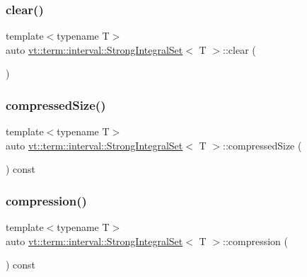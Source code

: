 \subsubsection{\texorpdfstring{clear()}{clear()}}
{\footnotesize\ttfamily template$<$typename T$>$ \\
auto \hyperlink{structvt_1_1term_1_1interval_1_1_strong_integral_set}{vt\+::term\+::interval\+::\+Strong\+Integral\+Set}$<$ T $>$\+::clear (\begin{DoxyParamCaption}{ }\end{DoxyParamCaption})\hspace{0.3cm}{\ttfamily [inline]}}

\mbox{\label{structvt_1_1term_1_1interval_1_1_strong_integral_set_a4cac42c716057ac5c1a6ac9da54f9edb}} 
\subsubsection{\texorpdfstring{compressed\+Size()}{compressedSize()}}
{\footnotesize\ttfamily template$<$typename T$>$ \\
auto \hyperlink{structvt_1_1term_1_1interval_1_1_strong_integral_set}{vt\+::term\+::interval\+::\+Strong\+Integral\+Set}$<$ T $>$\+::compressed\+Size (\begin{DoxyParamCaption}{ }\end{DoxyParamCaption}) const\hspace{0.3cm}{\ttfamily [inline]}}

\mbox{\label{structvt_1_1term_1_1interval_1_1_strong_integral_set_a1dd710e62148fc63329b0cd28cdcaf70}} 
\subsubsection{\texorpdfstring{compression()}{compression()}}
{\footnotesize\ttfamily template$<$typename T$>$ \\
auto \hyperlink{structvt_1_1term_1_1interval_1_1_strong_integral_set}{vt\+::term\+::interval\+::\+Strong\+Integral\+Set}$<$ T $>$\+::compression (\begin{DoxyParamCaption}{ }\end{DoxyParamCaption}) const\hspace{0.3cm}{\ttfamily [inline]}}

